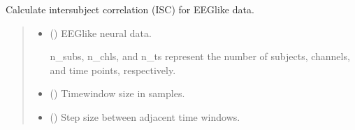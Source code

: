 \documentclass[letterpaper,10pt,english]{sphinxhowto}
\begin{document}
\begin{fulllineitems}
\label{\detokenize{isc_cal:neurora.isc_cal.isc}}
\pysigstartsignatures
{}
\pysigstopsignatures
\sphinxAtStartPar
Calculate inter\sphinxhyphen{}subject correlation (ISC) for EEG\sphinxhyphen{}like data.
\begin{quote}\begin{description}
\begin{itemize}
\item {} 
\sphinxAtStartPar
{} (\sphinxstyleliteralemphasis{\sphinxupquote{, }}\sphinxstyleliteralemphasis{\sphinxupquote{ {[}}}\sphinxstyleliteralemphasis{\sphinxupquote{, }}\sphinxstyleliteralemphasis{\sphinxupquote{, }}\sphinxstyleliteralemphasis{\sphinxupquote{{]}}}) \textendash{} 
\sphinxAtStartPar
EEG\sphinxhyphen{}like neural data.

\sphinxAtStartPar
n\_subs, n\_chls, and n\_ts represent the number of subjects, channels,
and time points, respectively.


\item {} 
\sphinxAtStartPar
{} (\sphinxstyleliteralemphasis{\sphinxupquote{, }}) \textendash{} Time\sphinxhyphen{}window size in samples.

\item {} 
\sphinxAtStartPar
{} (\sphinxstyleliteralemphasis{\sphinxupquote{, }}) \textendash{} Step size between adjacent time windows.


\end{itemize}
\end{description}
\end{quote}
\end{fulllineitems}
\end{document}

